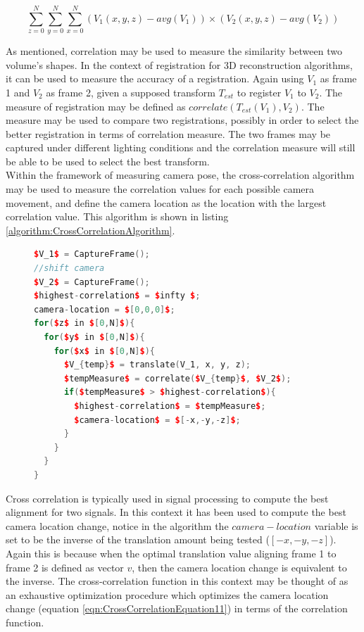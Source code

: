 \begin{equation} \label{eqn:CorrelationEquation}
\sum_{z=0}^{N}\sum_{y=0}^{N}\sum_{x=0}^{N}(V_1(x,y,z)-avg(V_1)) \times (V_2(x,y,z)-avg(V_2))
\end{equation}

As mentioned, correlation may be used to measure the similarity between two volume's shapes. In the context of registration for 3D reconstruction algorithms, it can be used to measure the accuracy of a registration. Again using $V_1$ as frame 1 and $V_2$ as frame 2, given a supposed transform $T_{est}$ to register $V_1$ to $V_2$. The measure of registration may be defined as $correlate(T_{est}(V_1), V_2)$. The measure may be used to compare two registrations, possibly in order to select the better registration in terms of correlation measure. The two frames may be captured under different lighting conditions and the correlation measure will still be able to be used to select the best transform. \\

Within the framework of measuring camera pose, the cross-correlation algorithm may be used to measure the correlation values for each possible camera movement, and define the camera location as the location with the largest correlation value. This algorithm is shown in listing \ref{algorithm:CrossCorrelationAlgorithm}.

\begin{figure}
\begin{lstlisting}[language=c++,caption=Cross-Correlation based camera location estimation,label=algorithm:CrossCorrelationAlgorithm,mathescape,basicstyle=\ttfamily]
$V_1$ = CaptureFrame();
//shift camera
$V_2$ = CaptureFrame();
$highest-correlation$ = $infty $;
camera-location = $[0,0,0]$;
for($z$ in $[0,N]$){
  for($y$ in $[0,N]$){
    for($x$ in $[0,N]$){
      $V_{temp}$ = translate(V_1, x, y, z);
	  $tempMeasure$ = correlate($V_{temp}$, $V_2$);
	  if($tempMeasure$ > $highest-correlation$){
	    $highest-correlation$ = $tempMeasure$;
		$camera-location$ = $[-x,-y,-z]$;
	  }		
	}
  }
}
\end{lstlisting}
\end{figure}

Cross correlation is typically used in signal processing to compute the best alignment for two signals. In this context it has been used to compute the best camera location change, notice in the algorithm the $camera-location$ variable is set to be the inverse of the translation amount being tested ($[-x,-y,-z]$). Again this is because when the optimal translation value aligning frame 1 to frame 2 is defined as vector $v$, then the camera location change is equivalent to the inverse. The cross-correlation function in this context may be thought of as an exhaustive optimization procedure which optimizes the camera location change (equation \ref{eqn:CrossCorrelationEquation11}) in terms of the correlation function.  \\

